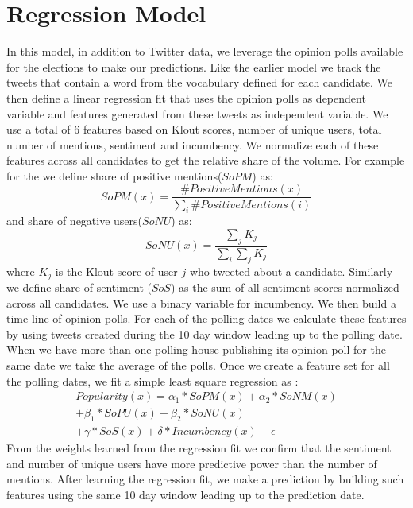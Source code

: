 \section{Regression Model}
In this model, in addition to Twitter data, we leverage the opinion polls available for the elections to make our predictions.
Like the earlier model we track the tweets that contain a word from the vocabulary defined for each candidate.
We then define a linear regression fit that uses the opinion polls as dependent variable and features generated from these tweets as independent variable.
We use a total of 6 features based on Klout scores, number of unique users, total number of mentions, sentiment and incumbency.
We normalize each of these features across all candidates to get the relative share of the volume. 
For example for the we define share of positive mentions($SoPM$)  as: 
\begin{equation}
SoPM(x) = \frac{\#PositiveMentions(x)}{\sum_i \#PositiveMentions(i)} 
\end{equation}
and share of negative users($SoNU$) as:
\begin{equation}
SoNU(x) = \frac{\sum_j K_j}{\sum_i \sum_j K_j}
\end{equation}
where $K_j$ is the Klout score of user $j$ who tweeted about a candidate.
Similarly we define share of sentiment ($SoS$) as the sum of all sentiment scores normalized across all candidates. 
We use a binary variable for incumbency. 
We then build a time-line of opinion polls. 
For each of the polling dates we calculate these features by using tweets created during the 10 day window leading up to the polling date.
When we have more than one polling house publishing its opinion poll for the same date we take the average of the polls. 
Once we create a feature set for all the polling dates, we fit a simple least square regression as :
\begin{equation}
\begin{split}
Popularity(x) = \alpha_1 * SoPM(x) + \alpha_2 * SoNM(x) \\
						 + \beta_1 * SoPU(x) + \beta_2 * SoNU(x) \\
						 + \gamma * SoS(x) + \delta * Incumbency(x) + \epsilon
\end{split}
\end{equation}
From the  weights learned from the regression fit we confirm that the sentiment and number of unique users have more predictive power than the number of mentions.	
After learning the regression fit, we make a prediction by building such features using the same 10 day window leading up to the prediction date.

